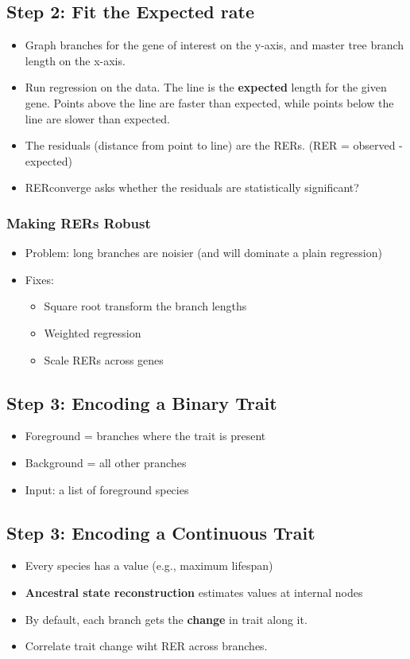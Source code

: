 \documentclass[10pt]{article}
\begin{document}
\subsection*{Step 2: Fit the Expected rate}
\begin{itemize}
    \item Graph branches for the gene of interest on the y-axis, and master tree branch length on the x-axis.
    \item Run regression on the data.  The line is the \textbf{expected} length for the given gene.  Points above the line are faster than expected, while points below the line are slower than expected.
    \item The residuals (distance from point to line) are the RERs.  (RER = observed - expected)
    \item RERconverge asks whether the residuals are statistically significant?
\end{itemize}

\subsubsection*{Making RERs Robust}
\begin{itemize}
    \item Problem: long branches are noisier (and will dominate a plain regression)
    \item Fixes:
    \begin{itemize}
        \item Square root transform the branch lengths
        \item Weighted regression
        \item Scale RERs across genes
    \end{itemize}
\end{itemize}

\subsection*{Step 3: Encoding a Binary Trait}
\begin{itemize}
    \item Foreground = branches where the trait is present
    \item Background = all other pranches
    \item Input: a list of foreground species
\end{itemize}

\subsection*{Step 3: Encoding a Continuous Trait}
\begin{itemize}
    \item Every species has a value (e.g., maximum lifespan)
    \item \textbf{Ancestral state reconstruction} estimates values at internal nodes
    \item By default, each branch gets the \textbf{change} in trait along it.
    \item Correlate trait change wiht RER across branches.
\end{itemize}
\end{document}
